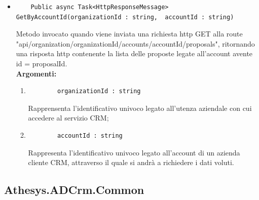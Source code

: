 \begin{itemize}
	\item 
	\begin{lstlisting}
	Public async Task<HttpResponseMessage> GetByAccountId(organizationId : string,  accountId : string)
	\end{lstlisting}
	Metodo invocato quando viene inviata una richiesta http GET alla route "api/organization/{organizationId}/accounts/{accountId}/proposals", ritornando una risposta http contenente la lista delle proposte legate all'account avente id = {proposalId}.\\
	\textbf{\small Argomenti:}
	\begin{enumerate}[leftmargin=*]
		\itemsep0em 
		\item 
		\begin{lstlisting}
		organizationId : string 
		\end{lstlisting}
		Rapprensenta l'identificativo univoco legato all'utenza aziendale con cui accedere al servizio CRM;
		\item 
		\begin{lstlisting}
		accountId : string
		\end{lstlisting}
		Rappresenta l'identificativo univoco legato all'account di un azienda cliente CRM, attraverso il quale si andrà a richiedere i dati voluti.
	\end{enumerate}
\end{itemize}

\vfill
\subsection{Athesys.ADCrm.Common}

